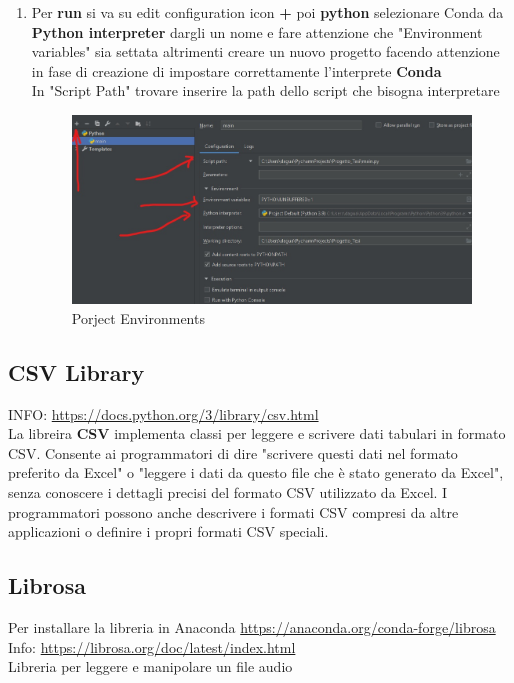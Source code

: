 \documentclass{article}
\begin{document}
\begin{enumerate}
\begin{figure}[h!]
        \label{fig:my_label}
    \end{figure}
    \item Per \textbf{run} si va su edit configuration icon\textbf{ +} poi \textbf{python} selezionare Conda da \textbf{Python interpreter} dargli un nome e fare attenzione che "Environment variables" sia settata altrimenti creare un nuovo progetto facendo attenzione in fase di creazione di impostare correttamente l'interprete \textbf{Conda}
    \\In "Script Path" trovare inserire la path dello script che bisogna interpretare
     \begin{figure}[h!]
        \centering
        \includegraphics[scale= 0.2]{image/Screenshot (29)_LI.jpg}
        \caption{Porject Environments}
        \label{fig:my_label}
    \end{figure}
\end{enumerate}
\subsection{CSV Library}
INFO: \url{https://docs.python.org/3/library/csv.html}
\\La libreira \textbf{CSV} implementa classi per leggere e scrivere dati tabulari in formato CSV. Consente ai programmatori di dire "scrivere questi dati nel formato preferito da Excel" o "leggere i dati da questo file che è stato generato da Excel", senza conoscere i dettagli precisi del formato CSV utilizzato da Excel. I programmatori possono anche descrivere i formati CSV compresi da altre applicazioni o definire i propri formati CSV speciali.
\subsection{Librosa}
Per installare la libreria in Anaconda \url{https://anaconda.org/conda-forge/librosa}
\\Info: \url{https://librosa.org/doc/latest/index.html}
\\Libreria per leggere e manipolare un file audio
\end{document}
